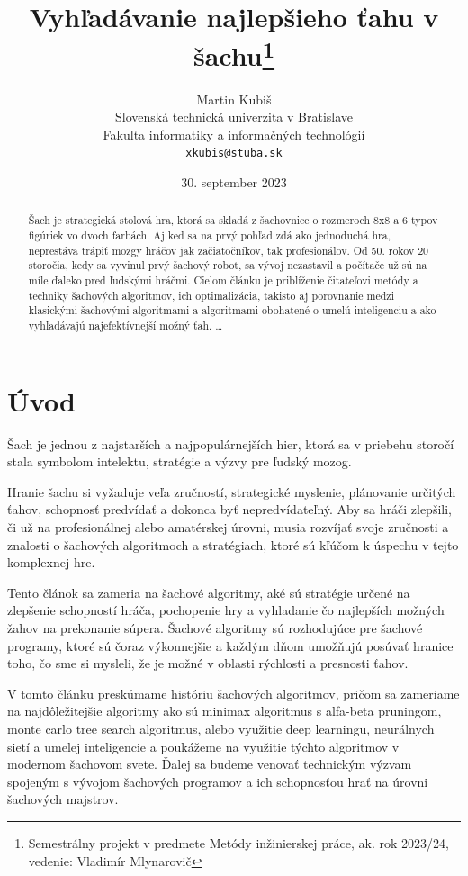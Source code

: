 \documentclass[10pt,twoside,slovak,a4paper]{article}
\title{Vyhľadávanie najlepšieho ťahu v šachu\thanks{Semestrálny projekt v predmete Metódy inžinierskej práce, ak. rok 2023/24, vedenie: Vladimír Mlynarovič}} %
\author{Martin Kubiš\\[2pt]
	{\small Slovenská technická univerzita v Bratislave}\\
	{\small Fakulta informatiky a informačných technológií}\\
	{\small \texttt{xkubis@stuba.sk}}
	}
\date{\small 30. september 2023} %
\begin{document}
\maketitle

\begin{abstract}
Šach je strategická stolová hra, ktorá sa skladá z šachovnice o rozmeroch 8x8 a 6 typov figúriek vo dvoch farbách. Aj keď sa na prvý pohľad zdá ako jednoduchá hra, neprestáva trápiť mozgy hráčov jak začiatočníkov, tak profesionálov. Od 50. rokov 20 storočia, kedy sa vyvinul prvý šachový robot, sa vývoj nezastavil a počítače už sú na míle ďaleko pred ľudskými hráčmi. Cielom článku je priblíženie čitateľovi metódy a techniky šachových algoritmov, ich optimalizácia, takisto aj porovnanie medzi klasickými šachovými algoritmami a algoritmami obohatené o umelú inteligenciu a ako vyhľadávajú najefektívnejší možný ťah.
\ldots
\end{abstract}



\section{Úvod}
Šach je jednou z najstarších a najpopulárnejších hier, ktorá sa v priebehu storočí stala symbolom intelektu, stratégie a výzvy pre ľudský mozog. 

Hranie šachu si vyžaduje veľa zručností, strategické myslenie, plánovanie určitých ťahov, schopnosť predvídať a dokonca byť nepredvídateľný. Aby sa hráči zlepšili, či už na profesionálnej alebo amatérskej úrovni, musia rozvíjať svoje zručnosti a znalosti o šachových algoritmoch a stratégiach, ktoré sú kľúčom k úspechu v tejto komplexnej hre.

Tento článok sa zameria na šachové algoritmy, aké sú stratégie určené na zlepšenie schopností hráča, pochopenie hry a vyhladanie čo najlepších možných žahov na prekonanie súpera. Šachové algoritmy sú rozhodujúce pre šachové programy, ktoré sú čoraz výkonnejšie a každým dňom umožňujú posúvať hranice toho, čo sme si mysleli, že je možné v oblasti rýchlosti a presnosti ťahov.

V tomto článku preskúmame históriu šachových algoritmov, pričom sa zameriame na najdôležitejšie algoritmy ako sú minimax algoritmus s alfa-beta pruningom, monte carlo tree search algoritmus, alebo využitie deep learningu, neurálnych sietí a umelej inteligencie a poukážeme na využitie týchto algoritmov v modernom šachovom svete. Ďalej sa budeme venovať technickým výzvam spojeným s vývojom šachových programov a ich schopnosťou hrať na úrovni šachových majstrov. 
\end{document}
